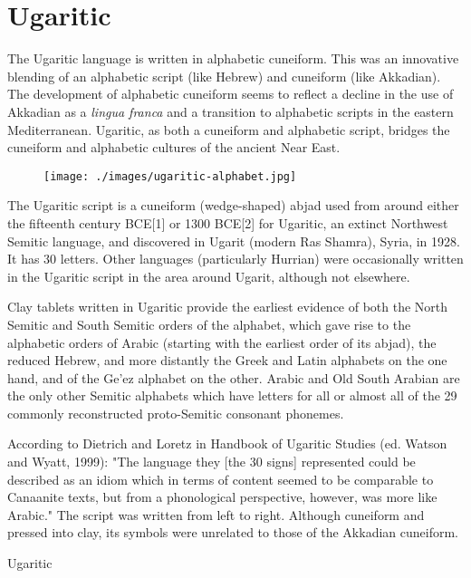 \section{Ugaritic}
\label{s:ugaritic}
\newfontfamily{}

The Ugaritic language is written in alphabetic cuneiform. This was an innovative blending of an alphabetic script (like Hebrew) and cuneiform (like Akkadian). The development of alphabetic cuneiform seems to reflect a decline in the use of Akkadian as a \textit{lingua franca} and a transition to alphabetic scripts in the eastern Mediterranean. Ugaritic, as both a cuneiform and alphabetic script, bridges the cuneiform and alphabetic cultures of the ancient Near East.


\begin{figure}[hb]
\centering
\texttt{[image: ./images/ugaritic-alphabet.jpg]}
\end{figure}

The Ugaritic script is a cuneiform (wedge-shaped) abjad used from around either the fifteenth century BCE[1] or 1300 BCE[2] for Ugaritic, an extinct Northwest Semitic language, and discovered in Ugarit (modern Ras Shamra), Syria, in 1928. It has 30 letters. Other languages (particularly Hurrian) were occasionally written in the Ugaritic script in the area around Ugarit, although not elsewhere.

Clay tablets written in Ugaritic provide the earliest evidence of both the North Semitic and South Semitic orders of the alphabet, which gave rise to the alphabetic orders of Arabic (starting with the earliest order of its abjad), the reduced Hebrew, and more distantly the Greek and Latin alphabets on the one hand, and of the Ge'ez alphabet on the other. Arabic and Old South Arabian are the only other Semitic alphabets which have letters for all or almost all of the 29 commonly reconstructed proto-Semitic consonant phonemes. 

According to Dietrich and Loretz in Handbook of Ugaritic Studies (ed. Watson and Wyatt, 1999): "The language they [the 30 signs] represented could be described as an idiom which in terms of content seemed to be comparable to Canaanite texts, but from a phonological perspective, however, was more like Arabic."
The script was written from left to right. Although cuneiform and pressed into clay, its symbols were unrelated to those of the Akkadian cuneiform.

\begin{scriptexample}[]{Ugaritic}
\end{scriptexample}


